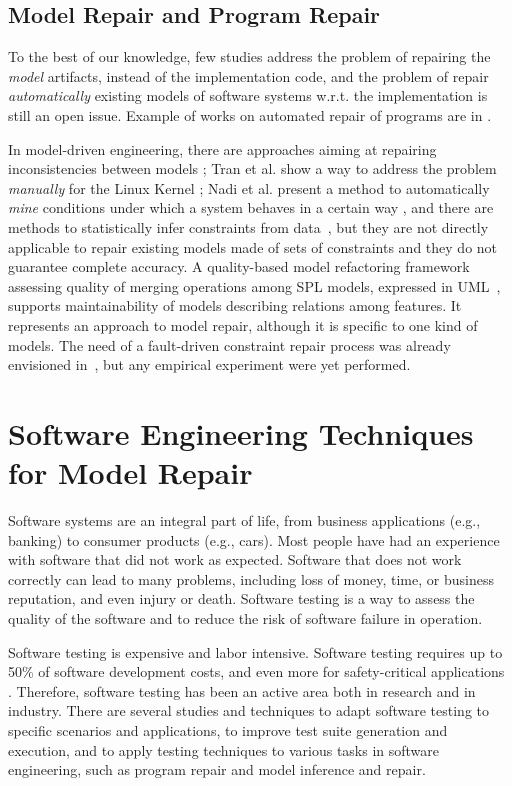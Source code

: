 \subsection{Model Repair and Program Repair}
To the best of our knowledge, few studies address the problem of repairing the \textit{model} artifacts, instead of the implementation code, and the problem of repair \textit{automatically} existing models of software systems w.r.t. the implementation is still an open issue. 
Example of works on automated repair of programs are in \cite{Nguyen_2013,le_goues_systematic_2012,ARCURI20113494}.

In model-driven engineering, there are approaches aiming at repairing inconsistencies between models \cite{Macedo_2013}; Tran et al. show a way to address the problem \textit{manually} for the Linux Kernel \cite{Tran:1999:FRR:781995.782007}; Nadi et al. present a method to automatically \textit{mine} conditions under which a system behaves in a certain way \cite{NadiBKC14}, and there are methods to statistically infer constraints from data~\cite{chiang_unified_2011,Abukwaik_2016}, but they are not directly applicable to repair existing models made of sets of constraints and they do not guarantee complete accuracy. 
A quality-based model refactoring framework assessing quality of merging operations among SPL models, expressed in UML~\cite{rubin_quality_2013}, supports maintainability of models describing relations among features. It represents an approach to model repair, although it is specific to one kind of models.
The need of a fault-driven constraint repair process was already envisioned in~\cite{henard_towards_2013}, but any empirical experiment were yet performed.

\section{Software Engineering Techniques for Model Repair}\label{sec:testing}
Software systems are an integral part of life, from business applications (e.g., banking) to consumer
products (e.g., cars). Most people have had an experience with software that did not work as expected.
Software that does not work correctly can lead to many problems, including loss of money, time, or
business reputation, and even injury or death. Software testing is a way to assess the quality of the
software and to reduce the risk of software failure in operation.

Software testing is expensive and labor intensive. Software testing requires up to 50\% of software development costs, and even more for safety-critical applications \cite{testingbook}.
Therefore, software testing has been an active area both in research and in industry.
There are several studies and techniques to adapt software testing to specific scenarios and applications, to improve test suite generation and execution, and to apply testing techniques to various tasks in software engineering, such as program repair and model inference and repair. \cite{le_goues_systematic_2012,chiang_unified_2011,Duchene:2012,Xuan_2017}

